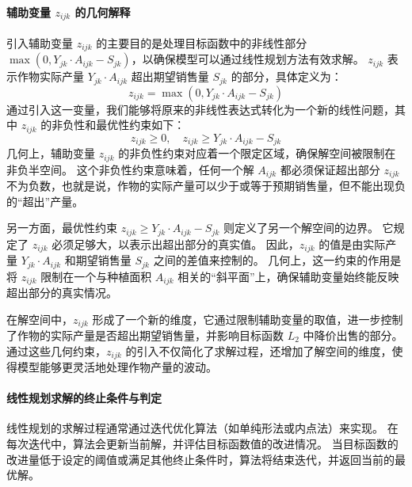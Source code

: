 \documentclass[12pt,a4paper]{nmmcm}
\begin{document}
\paragraph{辅助变量 $z_{ijk}$ 的几何解释}

引入辅助变量 $z_{ijk}$ 的主要目的是处理目标函数中的非线性部分 $\max(0, Y_{jk} \cdot A_{ijk} - S_{jk})$，以确保模型可以通过线性规划方法有效求解。
$z_{ijk}$ 表示作物实际产量 $Y_{jk} \cdot A_{ijk}$ 超出期望销售量 $S_{jk}$ 的部分，具体定义为：
\[
  z_{ijk} = \max(0, Y_{jk} \cdot A_{ijk} - S_{jk})
\]
通过引入这一变量，我们能够将原来的非线性表达式转化为一个新的线性问题，其中 $z_{ijk}$ 的非负性和最优性约束如下：
\[
  z_{ijk} \geq 0, \quad z_{ijk} \geq Y_{jk} \cdot A_{ijk} - S_{jk}
\]
几何上，辅助变量 $z_{ijk}$ 的非负性约束对应着一个限定区域，确保解空间被限制在非负半空间。
这个非负性约束意味着，任何一个解 $A_{ijk}$ 都必须保证超出部分 $z_{ijk}$ 不为负数，也就是说，作物的实际产量可以少于或等于预期销售量，但不能出现负的“超出”产量。


另一方面，最优性约束 $z_{ijk} \geq Y_{jk} \cdot A_{ijk} - S_{jk}$ 则定义了另一个解空间的边界。
它规定了 $z_{ijk}$ 必须足够大，以表示出超出部分的真实值。
因此，$z_{ijk}$ 的值是由实际产量 $Y_{jk} \cdot A_{ijk}$ 和期望销售量 $S_{jk}$ 之间的差值来控制的。
几何上，这一约束的作用是将 $z_{ijk}$ 限制在一个与种植面积 $A_{ijk}$ 相关的“斜平面”上，确保辅助变量始终能反映超出部分的真实情况。


在解空间中，$z_{ijk}$ 形成了一个新的维度，它通过限制辅助变量的取值，进一步控制了作物的实际产量是否超出期望销售量，并影响目标函数 $L_2$ 中降价出售的部分。
通过这些几何约束，$z_{ijk}$ 的引入不仅简化了求解过程，还增加了解空间的维度，使得模型能够更灵活地处理作物产量的波动。


\paragraph{线性规划求解的终止条件与判定}

线性规划的求解过程通常通过迭代优化算法（如单纯形法或内点法）来实现。
在每次迭代中，算法会更新当前解，并评估目标函数值的改进情况。
当目标函数的改进量低于设定的阈值或满足其他终止条件时，算法将结束迭代，并返回当前的最优解。
\end{document}
